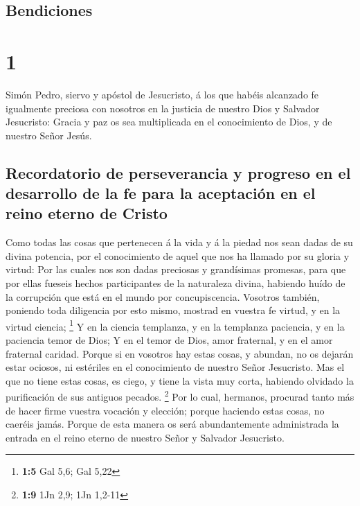 \hypertarget{bendiciones}{%
\subsection{Bendiciones}\label{bendiciones}}

\hypertarget{section}{%
\section{1}\label{section}}

 Simón Pedro, siervo y apóstol de Jesucristo, á los que
habéis alcanzado fe igualmente preciosa con nosotros en la justicia de
nuestro Dios y Salvador Jesucristo:  Gracia y paz os sea
multiplicada en el conocimiento de Dios, y de nuestro Señor Jesús.

\hypertarget{recordatorio-de-perseverancia-y-progreso-en-el-desarrollo-de-la-fe-para-la-aceptaciuxf3n-en-el-reino-eterno-de-cristo}{%
\subsection{Recordatorio de perseverancia y progreso en el desarrollo de
la fe para la aceptación en el reino eterno de
Cristo}\label{recordatorio-de-perseverancia-y-progreso-en-el-desarrollo-de-la-fe-para-la-aceptaciuxf3n-en-el-reino-eterno-de-cristo}}

 Como todas las cosas que pertenecen á la vida y á la piedad
nos sean dadas de su divina potencia, por el conocimiento de aquel que
nos ha llamado por su gloria y virtud:  Por las cuales nos
son dadas preciosas y grandísimas promesas, para que por ellas fueseis
hechos participantes de la naturaleza divina, habiendo huído de la
corrupción que está en el mundo por concupiscencia. 
Vosotros también, poniendo toda diligencia por esto mismo, mostrad en
vuestra fe virtud, y en la virtud ciencia; \footnote{\textbf{1:5} Gal
  5,6; Gal 5,22}  Y en la ciencia templanza, y en la
templanza paciencia, y en la paciencia temor de Dios;  Y en
el temor de Dios, amor fraternal, y en el amor fraternal caridad.
 Porque si en vosotros hay estas cosas, y abundan, no os
dejarán estar ociosos, ni estériles en el conocimiento de nuestro Señor
Jesucristo.  Mas el que no tiene estas cosas, es ciego, y
tiene la vista muy corta, habiendo olvidado la purificación de sus
antiguos pecados. \footnote{\textbf{1:9} 1Jn 2,9; 1Jn 1,2-11}
 Por lo cual, hermanos, procurad tanto más de hacer firme
vuestra vocación y elección; porque haciendo estas cosas, no caeréis
jamás.  Porque de esta manera os será abundantemente
administrada la entrada en el reino eterno de nuestro Señor y Salvador
Jesucristo.

